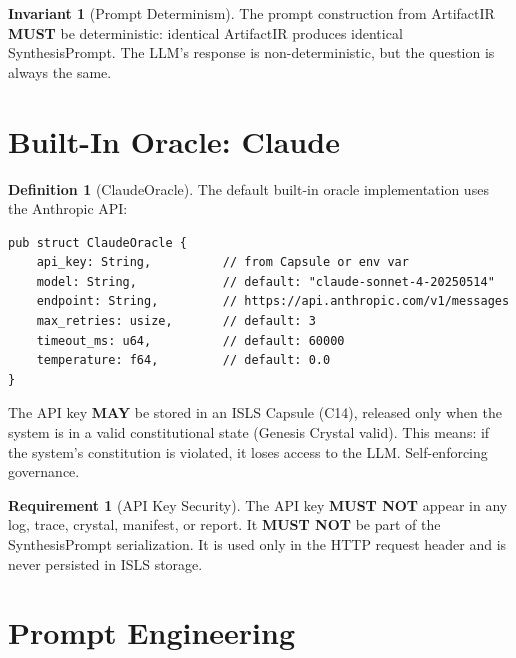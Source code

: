 \documentclass[11pt,a4paper,twoside]{article}
\theoremstyle{definition}
\newtheorem{definition}{Definition}[section]
\newtheorem{requirement}{Requirement}[section]
\newtheorem{invariant}{Invariant}[section]
\theoremstyle{plain}
\theoremstyle{remark}
\newcommand{\ISLS}{\textsf{ISLS}}
\begin{document}
\begin{invariant}[Prompt Determinism]\label{inv:promptdet}
The prompt construction from ArtifactIR \textbf{MUST} be deterministic:
identical ArtifactIR produces identical SynthesisPrompt. The LLM's
response is non-deterministic, but the question is always the same.
\end{invariant}


\section{Built-In Oracle: Claude}\label{sec:claude}

\begin{definition}[ClaudeOracle]\label{def:claude}
The default built-in oracle implementation uses the Anthropic API:
\begin{lstlisting}
pub struct ClaudeOracle {
    api_key: String,          // from Capsule or env var
    model: String,            // default: "claude-sonnet-4-20250514"
    endpoint: String,         // https://api.anthropic.com/v1/messages
    max_retries: usize,       // default: 3
    timeout_ms: u64,          // default: 60000
    temperature: f64,         // default: 0.0
}
\end{lstlisting}
The API key \textbf{MAY} be stored in an \ISLS{} Capsule (C14),
released only when the system is in a valid constitutional state
(Genesis Crystal valid). This means: if the system's constitution is
violated, it loses access to the LLM. Self-enforcing governance.
\end{definition}

\begin{requirement}[API Key Security]\label{req:apikeysec}
The API key \textbf{MUST NOT} appear in any log, trace, crystal,
manifest, or report. It \textbf{MUST NOT} be part of the
SynthesisPrompt serialization. It is used only in the HTTP request
header and is never persisted in \ISLS{} storage.
\end{requirement}


\section{Prompt Engineering}\label{sec:prompts}
\end{document}
